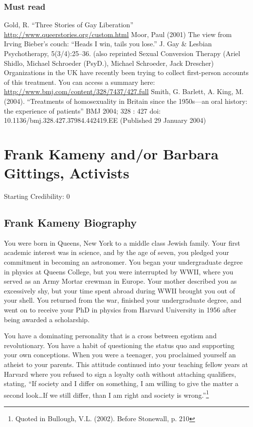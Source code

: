 \begin{refsection}
\subsection{Must read}
\label{mustread}

Gold, R. “Three Stories of Gay Liberation” \url{http://www.queerstories.org/custom.html}
Moor, Paul (2001) The view from Irving Bieber's couch: “Heads I win, tails you lose.” J. Gay \& Lesbian Psychotherapy, 5(3\slash 4):25--36. (also reprinted Sexual Conversion Therapy (Ariel Shidlo, Michael Schroeder (PsyD.), Michael Schroeder, Jack Drescher)
Organizations in the UK have recently been trying to collect first-person accounts of this treatment. You can access a summary here: \url{http://www.bmj.com/content/328/7437/427.full} Smith, G. Barlett, A. King, M. (2004). “Treatments of homosexuality in Britain since the 1950s—an oral history: the experience of patients” BMJ 2004; 328 : 427 doi: 10.1136\slash bmj.328.427.37984.442419.EE (Published 29 January 2004)

\chapter{Frank Kameny and\slash or Barbara Gittings, Activists}
\label{frankkamenyandorbarbaragittingsactivists}

Starting Credibility: 0

\section{Frank Kameny Biography}
\label{frankkamenybiography}

You were born in Queens, New York to a middle class Jewish family. Your first academic interest was in science, and by the age of seven, you pledged your commitment in becoming an astronomer. You began your undergraduate degree in physics at Queens College, but you were interrupted by WWII, where you served as an Army Mortar crewman in Europe. Your mother described you as excessively shy, but your time spent abroad during WWII brought you out of your shell. You returned from the war, finished your undergraduate degree, and went on to receive your PhD in physics from Harvard University in 1956 after being awarded a scholarship.

You have a dominating personality that is a cross between egotism and revolutionary. You have a habit of questioning the status quo and supporting your own conceptions. When you were a teenager, you proclaimed yourself an atheist to your parents. This attitude continued into your teaching fellow years at Harvard where you refused to sign a loyalty oath without attaching qualifiers, stating, “If society and I differ on something, I am willing to give the matter a second look…If we still differ, than I am right and society is wrong.”\footnote{Quoted in Bullough, V.L. (2002). Before Stonewall, p. 210}


\end{refsection}
